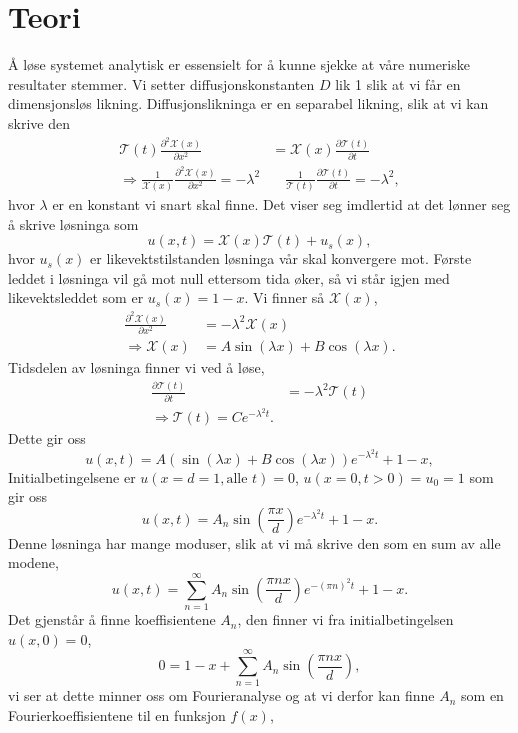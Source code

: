 \documentclass[norsk, 10pt]{article}
\def\para#1{\left( #1 \right)}
\begin{document}
\section*{Teori}
Å løse systemet analytisk er essensielt for å kunne sjekke at våre numeriske resultater stemmer. Vi setter diffusjonskonstanten $D$ lik 1 slik at vi får en dimensjonsløs likning. Diffusjonslikninga er en separabel likning, slik at vi kan skrive den
\begin{align*}
\mathcal T(t) \frac{\partial^2\mathcal X(x)}{\partial x^2} &= \mathcal X(x) \frac{\partial \mathcal T(t)}{\partial t} \\
\Rightarrow \frac{1}{\mathcal X(x)} \frac{\partial^2\mathcal X(x)}{\partial x^2} = -\lambda^2 &\quad \frac{1}{\mathcal T(t)} \frac{\partial\mathcal T(t)}{\partial t} = -\lambda^2,
\end{align*}
hvor $\lambda$ er en konstant vi snart skal finne. Det viser seg imdlertid at det lønner seg å skrive løsninga som
$$ u(x,t) = \mathcal X(x)\mathcal T(t) + u_s(x), $$
hvor $u_s(x)$ er likevektstilstanden løsninga vår skal konvergere mot. Første leddet i løsninga vil gå mot null ettersom tida øker, så vi står igjen med likevektsleddet som er $u_s(x) = 1-x$. Vi finner så $\mathcal X(x)$,
\begin{align*}
 \frac{\partial^2\mathcal X(x)}{\partial x^2} &= -\lambda^2\mathcal X(x) \\
 \Rightarrow \mathcal X(x) &= A\sin(\lambda x) + B\cos(\lambda x).
\end{align*}
Tidsdelen av løsninga finner vi ved å løse,
\begin{align*}
 \frac{\partial\mathcal T(t)}{\partial t} &= -\lambda^2\mathcal T(t) \\
 \Rightarrow \mathcal T(t) = Ce^{-\lambda^2 t}.
\end{align*}
Dette gir oss
$$ u(x,t) = A\para{\sin\para{\lambda x} + B\cos(\lambda x)}e^{-\lambda^2 t} + 1 - x, $$
Initialbetingelsene er $u(x=d=1,\text{alle } t) = 0$, $u(x=0,t > 0) = u_0 = 1$ som gir oss
$$ u(x,t) = A_n\sin\para{\frac{\pi x}{d}}e^{-\lambda^2 t} + 1 - x. $$
Denne løsninga har mange moduser, slik at vi må skrive den som en sum av alle modene,
$$ u(x,t) = \sum\limits_{n=1}^{\infty}A_n\sin\para{\frac{\pi nx}{d}}e^{-(\pi n)^2 t} + 1 - x.$$
Det gjenstår å finne koeffisientene $A_n$, den finner vi fra initialbetingelsen $u(x,0) = 0$,
$$ 0 = 1 - x + \sum\limits_{n=1}^{\infty} A_n\sin\para{\frac{\pi nx}{d}}, $$
vi ser at dette minner oss om Fourieranalyse og at vi derfor kan finne $A_n$ som en Fourierkoeffisientene til en funksjon $f(x)$,
\end{document}
